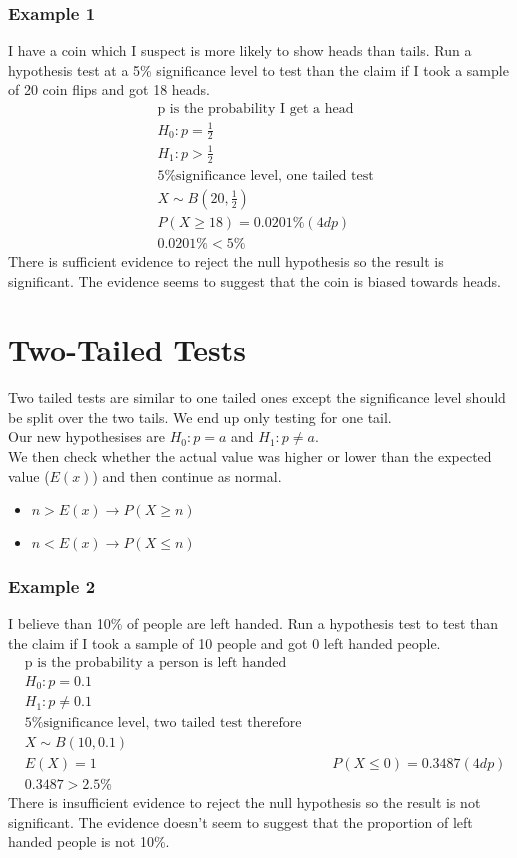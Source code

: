 \documentclass[a4paper,12pt]{article}
\begin{document}
\subsubsection*{Example 1}
I have a coin which I suspect is more likely to show heads than tails. Run a hypothesis test at a 5\% significance level to test than the claim if I took a sample of 20 coin flips and got 18 heads. 
\begin{align*}
& \text{p is the probability I get a head} \\
& H_0: p = \frac{1}{2} \\
& H_1: p > \frac{1}{2} \\
& \text{5\% significance level, one tailed test} \\
& X \sim B(20,\frac{1}{2}) \\
& P(X \geqslant 18) = 0.0201\% (4dp) \\
& 0.0201\%  < 5\%
\end{align*}
There is sufficient evidence to reject the null hypothesis so the result is significant. The evidence seems to suggest that the coin is biased towards heads. 

\section*{Two-Tailed Tests}
Two tailed tests are similar to one tailed ones except the significance level should be split over the two tails. We end up only testing for one tail. \\
Our new hypothesises are $H_0: p = a$ and $H_1: p \neq a$. \\
We then check whether the actual value was higher or lower than the expected value ($E(x)$) and then continue as normal. 
\begin{itemize}
	\item $n > E(x) \rightarrow P(X \geqslant n)$
	\item $n < E(x) \rightarrow P(X \leqslant n)$
\end{itemize}
\subsubsection*{Example 2}
I believe than 10\% of people are left handed. Run a hypothesis test to test than the claim if I took a sample of 10 people and got 0 left handed people.
\begin{align*}
& \text{p is the probability a person is left handed} \\
& H_0: p = 0.1 \\
& H_1: p \neq 0.1 \\
& \text{5\% significance level, two tailed test therefore 2.5\% each tail} \\
& X \sim B(10,0.1) \\
& E(X) = 1
& P(X \leqslant 0) = 0.3487 (4dp) \\
& 0.3487 > 2.5\%
\end{align*}
There is insufficient evidence to reject the null hypothesis so the result is not significant. The evidence doesn't seem to suggest that the proportion of left handed people is not 10\%.\\
\end{document}
